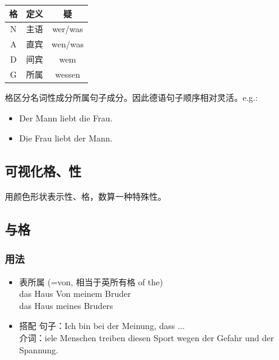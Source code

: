 \begin{center}
    \begin{tabular}{|c|c|c|}
        \hline
        \rowcolor{gray}
        格 & 定义 & 疑       \\
        \hline
        N & 主语 & wer/was \\
        \hline
        A & 直宾 & wen/was \\
        \hline
        D & 间宾 & wem     \\
        \hline
        G & 所属 & wessen  \\
        \hline
    \end{tabular}
\end{center}

格区分名词性成分所属句子成分。因此德语句子顺序相对灵活。e.g.:
\begin{itemize}
    \item Der Mann liebt die Frau.
    \item Die Frau liebt der Mann.
\end{itemize}

\subsection{可视化格、性}
用颜色形状表示性、格，数算一种特殊性。
\begin{center}
\end{center}

\subsection{与格}
\subsubsection{用法}
\begin{itemize}
    \item 表所属 (=von, 相当于英所有格 of the) \\
          das Haus Von meinem Bruder \\
          das Haus meines Bruders
    \item 搭配
          句子：Ich bin bei der Meinung, dass ... \\
          介词：iele Menschen treiben diesen Sport wegen der Gefahr und der Spannung. \\
\end{itemize}
